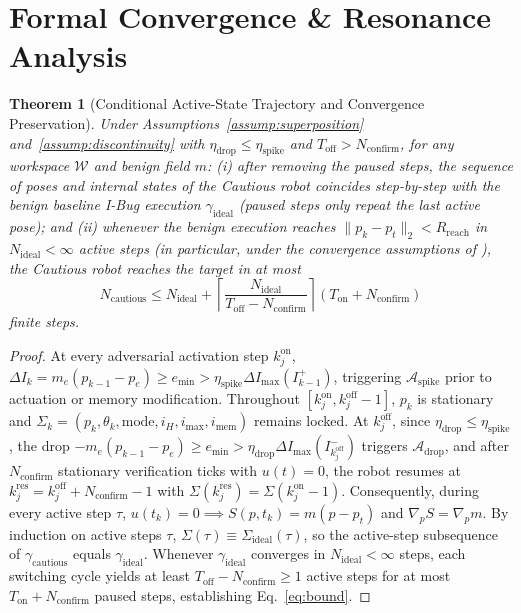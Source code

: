 \documentclass[10pt, a4paper, twocolumn]{article}
\newtheorem{theorem}{Theorem}
\begin{document}
\section{Formal Convergence \& Resonance Analysis}

\begin{theorem}[Conditional Active-State Trajectory and Convergence Preservation]
\label{thm:cautious}
Under Assumptions~\ref{assump:superposition} and~\ref{assump:discontinuity} with $\eta_{\text{drop}} \le \eta_{\text{spike}}$ and $T_{\text{off}} > N_{\text{confirm}}$, for any workspace $\mathcal{W}$ and benign field $m$:
(i) after removing the paused steps, the sequence of poses and internal states of the Cautious robot coincides step-by-step with the benign baseline I-Bug execution $\gamma_{\text{ideal}}$ (paused steps only repeat the last active pose); and
(ii) whenever the benign execution reaches $\|p_k - p_t\|_2 < R_{\text{reach}}$ in $N_{\text{ideal}} < \infty$ active steps (in particular, under the convergence assumptions of \cite{taylor2014intensity}), the Cautious robot reaches the target in at most
\begin{equation}
    N_{\text{cautious}} \le N_{\text{ideal}} + \left\lceil \frac{N_{\text{ideal}}}{T_{\text{off}} - N_{\text{confirm}}} \right\rceil (T_{\text{on}} + N_{\text{confirm}})
    \label{eq:bound}
\end{equation}
finite steps.
\end{theorem}

\begin{proof}
At every adversarial activation step $k_j^{\text{on}}$, $\Delta I_k = m_e(p_{k-1} - p_e) \ge e_{\min} > \eta_{\text{spike}}\Delta I_{\max}(I_{k-1}^+)$, triggering $\mathcal{A}_{\text{spike}}$ prior to actuation or memory modification. Throughout $[k_j^{\text{on}}, k_j^{\text{off}}-1]$, $p_k$ is stationary and $\Sigma_k = (p_k, \theta_k, \text{mode}, i_H, i_{\text{max}}, i_{\text{mem}})$ remains locked. At $k_j^{\text{off}}$, since $\eta_{\text{drop}} \le \eta_{\text{spike}}$, the drop $-m_e(p_{k-1}-p_e) \ge e_{\min} > \eta_{\text{drop}}\Delta I_{\max}(I_{k_j^{\text{off}}}^-)$ triggers $\mathcal{A}_{\text{drop}}$, and after $N_{\text{confirm}}$ stationary verification ticks with $u(t)=0$, the robot resumes at $k_j^{\text{res}} = k_j^{\text{off}} + N_{\text{confirm}} - 1$ with $\Sigma(k_j^{\text{res}}) = \Sigma(k_j^{\text{on}} - 1)$. Consequently, during every active step $\tau$, $u(t_k) = 0 \implies S(p, t_k) = m(p - p_t)$ and $\nabla_p S = \nabla_p m$. By induction on active steps $\tau$, $\Sigma(\tau) \equiv \Sigma_{\text{ideal}}(\tau)$, so the active-step subsequence of $\gamma_{\text{cautious}}$ equals $\gamma_{\text{ideal}}$. Whenever $\gamma_{\text{ideal}}$ converges in $N_{\text{ideal}} < \infty$ steps, each switching cycle yields at least $T_{\text{off}} - N_{\text{confirm}} \ge 1$ active steps for at most $T_{\text{on}} + N_{\text{confirm}}$ paused steps, establishing Eq.~\eqref{eq:bound}.
\end{proof}
\end{document}
